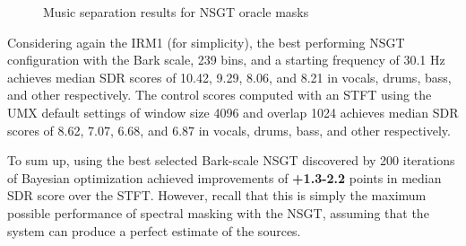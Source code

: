 \documentclass[letter,12pt,notitlepage]{article}
\begin{document}
\begin{figure}[ht]
	\centering
{}
\caption{Music separation results for NSGT oracle masks}
\label{fig:nsgtboxplots}
\end{figure}

Considering again the IRM1 (for simplicity), the best performing NSGT configuration with the Bark scale, 239 bins, and a starting frequency of 30.1 Hz achieves median SDR scores of 10.42, 9.29, 8.06, and 8.21 in vocals, drums, bass, and other respectively. The control scores computed with an STFT using the UMX default settings of window size 4096 and overlap 1024 achieves median SDR scores of 8.62, 7.07, 6.68, and 6.87 in vocals, drums, bass, and other respectively.

To sum up, using the best selected Bark-scale NSGT discovered by 200 iterations of Bayesian optimization achieved improvements of \textbf{+1.3-2.2} points in median SDR score over the STFT. However, recall that this is simply the maximum possible performance of spectral masking with the NSGT, assuming that the system can produce a perfect estimate of the sources.
\end{document}

